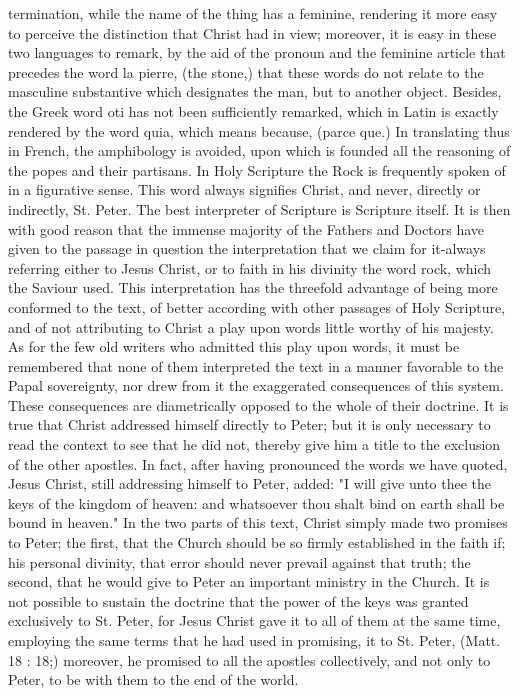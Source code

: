 termination, while the name of the thing has a feminine, rendering it more easy to perceive the distinction that Christ had in view; moreover, it is easy in these two languages to remark, by the aid of the pronoun and the feminine article that precedes the word la pierre, (the stone,) that these words do not relate to the masculine substantive which designates the man, but to another object. Besides, the Greek word oti has not been sufficiently remarked, which in Latin is exactly rendered by the word quia, which means because, (parce que.) In translating thus in French, the amphibology is avoided, upon which is founded all the reasoning of the popes and their partisans. In Holy Scripture the Rock is frequently spoken of in a figurative sense. This word always signifies Christ, and never, directly or indirectly, St. Peter. The best interpreter of Scripture is Scripture itself. It is then with good reason that the immense majority of the Fathers and Doctors have given to the passage in question the interpretation that we claim for it-always referring either to Jesus Christ, or to faith in his divinity the word rock, which the Saviour used. This interpretation has the threefold advantage of being more conformed to the text, of better according with other passages of Holy Scripture, and of not attributing to Christ a play upon words little worthy of his majesty. As for the few old writers who admitted this play upon words, it must be remembered that none of them interpreted the text in a manner favorable to the Papal sovereignty, nor drew from it the exaggerated consequences of this system. These consequences are diametrically opposed to the whole of their doctrine. It is true that Christ addressed himself directly to Peter; but it is only necessary to read the context to see that he did not, thereby give him a title to the exclusion of the other apostles. In fact, after having pronounced the words we have quoted, Jesus Christ, still addressing himself to Peter, added: "I will give unto thee the keys of the kingdom of heaven: and whatsoever thou shalt bind on earth shall be bound in heaven." In the two parts of this text, Christ simply made two promises to Peter; the first, that the Church should be so firmly established in the faith if; his personal divinity, that error should never prevail against that truth; the second, that he would give to Peter an important ministry in the Church. It is not possible to sustain the doctrine that the power of the keys was granted exclusively to St. Peter, for Jesus Christ gave it to all of them at the same time, employing the same terms that he had used in promising, it to St. Peter, (Matt. 18 : 18;) moreover, he promised to all the apostles collectively, and not only to Peter, to be with them to the end of the world.

